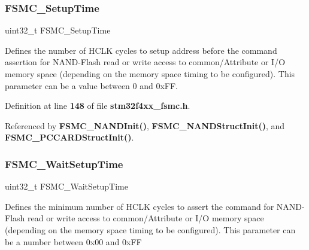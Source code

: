 \mbox{\label{structFSMC__NAND__PCCARDTimingInitTypeDef_a3b0b076d6c5cae5a023aba6d74ffb1b7}} 
\subsubsection{F\+S\+M\+C\+\_\+\+Setup\+Time}
{\footnotesize\ttfamily uint32\+\_\+t F\+S\+M\+C\+\_\+\+Setup\+Time}

Defines the number of H\+C\+LK cycles to setup address before the command assertion for N\+A\+N\+D-\/\+Flash read or write access to common/\+Attribute or I/O memory space (depending on the memory space timing to be configured). This parameter can be a value between 0 and 0x\+FF. 

Definition at line \textbf{ 148} of file \textbf{ stm32f4xx\+\_\+fsmc.\+h}.



Referenced by \textbf{ F\+S\+M\+C\+\_\+\+N\+A\+N\+D\+Init()}, \textbf{ F\+S\+M\+C\+\_\+\+N\+A\+N\+D\+Struct\+Init()}, and \textbf{ F\+S\+M\+C\+\_\+\+P\+C\+C\+A\+R\+D\+Struct\+Init()}.

\mbox{\label{structFSMC__NAND__PCCARDTimingInitTypeDef_abf4f8b523317ce9a2e079c2b5ac1d857}} 
\subsubsection{F\+S\+M\+C\+\_\+\+Wait\+Setup\+Time}
{\footnotesize\ttfamily uint32\+\_\+t F\+S\+M\+C\+\_\+\+Wait\+Setup\+Time}

Defines the minimum number of H\+C\+LK cycles to assert the command for N\+A\+N\+D-\/\+Flash read or write access to common/\+Attribute or I/O memory space (depending on the memory space timing to be configured). This parameter can be a number between 0x00 and 0x\+FF 

